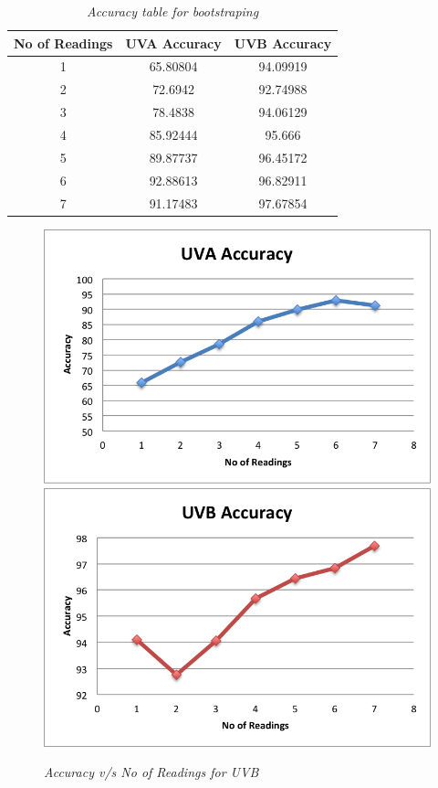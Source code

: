 \documentclass[12pt,fullpage,doublespace]{article}
\begin{document}
\newpage
\begin{table}
\centering
\begin{tabular}{|c|c|c|}
\hline
No of Readings & UVA Accuracy & UVB Accuracy \\
\hline 
1 & 65.80804 & 94.09919\\
\hline
2 & 72.6942 & 92.74988\\
\hline
3 & 78.4838 & 94.06129\\
\hline
4 & 85.92444 & 95.666\\
\hline
5 & 89.87737 & 96.45172\\
\hline
6 & 92.88613 & 96.82911\\
\hline
7 & 91.17483 & 97.67854\\
\hline
\end{tabular}
\caption{\small \sl Accuracy table for bootstraping}\label{seg7accuracy}
\end{table}


\begin{figure}
\begin{center}
\includegraphics[scale=0.5]{segment7uva.png}
\includegraphics[scale=0.5]{segment7uvb.png}
\caption{\small \sl Accuracy v/s No of Readings for UVB}
\label{fig:lessReadings}
\end{center}
\end{figure}
\end{document}
